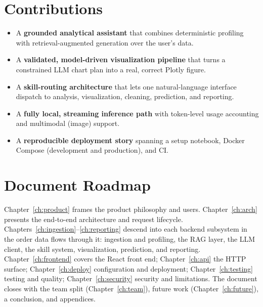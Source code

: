 \section{Contributions}
\begin{itemize}
  \item A \textbf{grounded analytical assistant} that combines deterministic
        profiling with retrieval-augmented generation over the user's data.
  \item A \textbf{validated, model-driven visualization pipeline} that turns a
        constrained LLM chart plan into a real, correct Plotly figure.
  \item A \textbf{skill-routing architecture} that lets one natural-language
        interface dispatch to analysis, visualization, cleaning, prediction, and
        reporting.
  \item A \textbf{fully local, streaming inference path} with token-level usage
        accounting and multimodal (image) support.
  \item A \textbf{reproducible deployment story} spanning a setup notebook,
        Docker Compose (development and production), and CI.
\end{itemize}

\section{Document Roadmap}
Chapter~\ref{ch:product} frames the product philosophy and users.
Chapter~\ref{ch:arch} presents the end-to-end architecture and request
lifecycle. Chapters~\ref{ch:ingestion}--\ref{ch:reporting} descend into each
backend subsystem in the order data flows through it: ingestion and profiling,
the RAG layer, the LLM client, the skill system, visualization, prediction, and
reporting. Chapter~\ref{ch:frontend} covers the React front end;
Chapter~\ref{ch:api} the HTTP surface; Chapter~\ref{ch:deploy} configuration and
deployment; Chapter~\ref{ch:testing} testing and quality;
Chapter~\ref{ch:security} security and limitations. The document closes with the
team split (Chapter~\ref{ch:team}), future work (Chapter~\ref{ch:future}), a
conclusion, and appendices.
